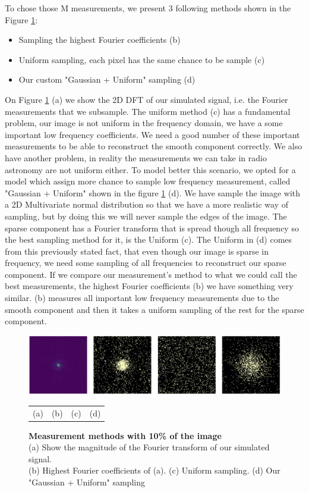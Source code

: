 \documentclass[a4paper,11pt,oneside]{report}
\theoremstyle{named}
\begin{document}
To chose those M measurements, we present 3 following methods shown in the Figure \ref{fig:samp}:

\begin{itemize}
    \item Sampling the highest Fourier coefficients (b)
    \item Uniform sampling, each pixel has the same chance to be sample (c)
    \item Our custom "Gaussian + Uniform" sampling (d)
\end{itemize}

On Figure \ref{fig:samp} (a) we show the 2D DFT of our simulated signal, i.e. the Fourier measurements that we subsample. The uniform method (c) has a fundamental problem, our image is not uniform in the frequency domain, we have a some important low frequency coefficients. We need a good number of these important measurements to be able to reconstruct the smooth component correctly. We also have another problem, in reality the measurements we can take in radio astronomy are not uniform either. To model better this scenario, we opted for a model which assign more chance to sample low frequency measurement, called "Gaussian + Uniform" shown in the figure \ref{fig:samp} (d). We have sample the image with a 2D Multivariate normal distribution so that we have a more realistic way of sampling, but by doing this we will never sample the edges of the image. The sparse component has a Fourier transform that is spread though all frequency so the best sampling method for it, is the Uniform (c). The Uniform in (d) comes from this previously stated fact, that even though our image is sparse in frequency, we need some sampling of all frequencies to reconstruct our sparse component. If we compare our measurement's method to what we could call the best measurements, the highest Fourier coefficients (b) we have something very similar. (b) measures all important low frequency measurements due to the smooth component and then it takes a uniform sampling of the rest for the sparse component.

\begin{figure}[t]
    \centering
    \includegraphics[width=1\textwidth]{Sampling_methods_comparison.png}
    \setlength{\tabcolsep}{39pt}
     \begin{tabular}{c c c c}
         (a) & (b) & (c) & (d)
    \end{tabular}
    \caption{\textbf{Measurement methods with 10\% of the image}\\(a) Show the magnitude of the Fourier transform of our simulated signal. \\ (b) Highest Fourier coefficients of (a). (c) Uniform sampling. (d) Our "Gaussian + Uniform" sampling}
    \label{fig:samp}
\end{figure}
\end{document}
